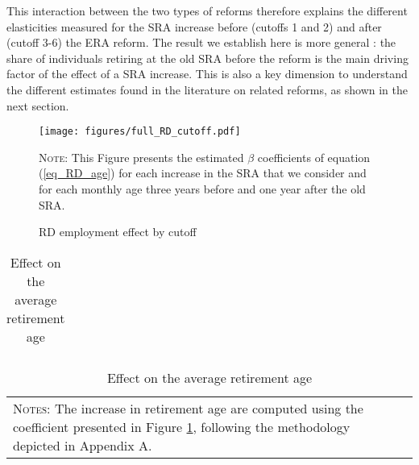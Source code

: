 \documentclass[12pt,a4paper]{article}
\begin{document}
This interaction between the two types of reforms therefore explains the different elasticities measured for the SRA increase before (cutoffs 1 and 2) and after (cutoff 3-6) the ERA reform. The result we establish here is more general : the share of individuals retiring at the old SRA before the reform is the main driving factor of the effect of a SRA increase. This is also a key dimension to understand the different estimates found in the literature on related reforms, as shown in the next section.



\begin{figure}[H]
	\begin{adjustwidth}{-1in}{-1in}	
\caption{RD employment effect by cutoff}
\label{full_RD_cutoff}
\centering
\texttt{[image: figures/full\_RD\_cutoff.pdf]}
\end{adjustwidth}
\begin{minipage}{15cm}%
\scriptsize
\textsc{Note:} This Figure presents the estimated $\beta$ coefficients of equation (\ref{eq_RD_age}) for each increase in the SRA that we consider and for each monthly age three years before and one year after the old SRA. 
\end{minipage}%
\end{figure}

\begin{table}[!t] 
	\begin{adjustbox}{max width = \textwidth, max totalheight=.6\textheight, keepaspectratio}
		\hspace*{-1cm}
		
		\caption{Effect on the average retirement age}
		\label{table_average_cutoff}
		\footnotesize
		\begin{tabular}{lcccccc}
			\toprule
			 		
		\end{tabular}
		\hspace*{-1cm}
	\end{adjustbox}
	
	\vspace*{-0.4cm}
	\begin{tabular}{ll}
		\footnotesize
		\begin{minipage}{12cm}%
			\textsc{Notes:} The increase in retirement age are computed using the coefficient presented in Figure \ref{full_RD_cutoff}, following the methodology depicted in Appendix A. 
		\end{minipage}%
	\end{tabular}
	\end{table}
\end{document}
